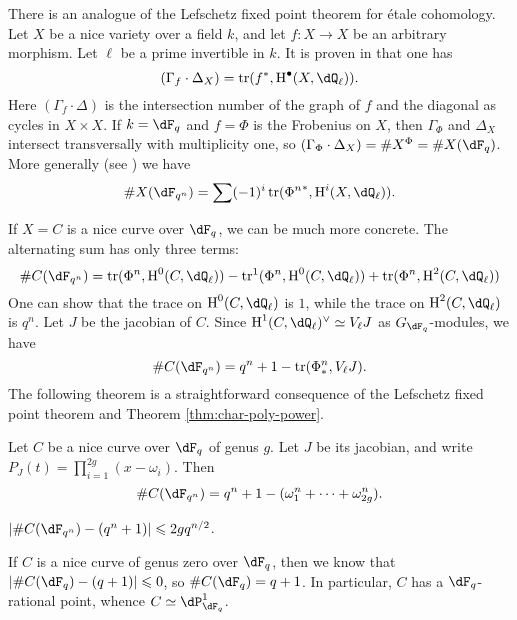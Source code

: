 \documentclass{article}
\begin{document}
There is an analogue of the Lefschetz fixed point theorem for \'etale 
cohomology. Let $X$ be a nice variety over a field $k$, and let 
$f:X\to X$ be an arbitrary morphism. Let $\ell$ be a prime invertible in $k$. 
It is proven in \cite[IV.3.3]{de77} that one has 
\[
  (\Gamma_f \cdot \Delta_X) = \trace(f^\ast,\h^\bullet(X,\dQ_\ell))\text{.}
\]
Here $(\Gamma_f\cdot \Delta)$ is the intersection number of the graph of $f$ 
and the diagonal as cycles in $X\times X$. If $k=\dF_q$ and $f=\Phi$ is the 
Frobenius on $X$, then $\Gamma_\Phi$ and $\Delta_X$ intersect transversally 
with multiplicity one, so 
$(\Gamma_\Phi\cdot \Delta_X)=\# X^\Phi=\# X(\dF_q)$. More generally (see 
\cite[IV.3.7]{de77}) we have
\[
  \# X(\dF_{q^n}) = \sum (-1)^i \trace({\Phi^n}^\ast, \h^i(X,\dQ_\ell)) \text{.}
\]

If $X=C$ is a nice curve over $\dF_q$, we can be much more concrete. The 
alternating sum has only three terms:
\[
  \# C(\dF_{q^n}) = \trace(\Phi^n,\h^0(C,\dQ_\ell)) - \trace^1(\Phi^n,\h^0(C,\dQ_\ell)) + \trace(\Phi^n,\h^2(C,\dQ_\ell))
\]
One can show that the trace on $\h^0(C,\dQ_\ell)$ is $1$, while the trace on 
$\h^2(C,\dQ_\ell)$ is $q^n$. Let $J$ be the jacobian of $C$. Since 
$\h^1(C,\dQ_\ell)^\vee \simeq V_\ell J$ as $G_{\dF_q}$-modules, we have 
\[
  \# C(\dF_{q^n}) = q^n+1 - \trace(\Phi_\ast^n, V_\ell J) \text{.}
\]
The following theorem is a straightforward consequence of the Lefschetz fixed 
point theorem and Theorem \ref{thm:char-poly-power}. 

\begin{theorem}
Let $C$ be a nice curve over $\dF_q$ of genus $g$. Let $J$ be its jacobian, and 
write $P_J(t) = \prod_{i=1}^{2 g} (x-\omega_i)$. Then 
\[
  \# C(\dF_{q^n}) = q^n+1 - (\omega_1^n + \cdots + \omega_{2 g}^n) \text{.}
\]
\end{theorem}

\begin{corollary}
$|\# C(\dF_{q^n}) - (q^n+1)| \leqslant 2 g q^{n/2}$.
\end{corollary}






\begin{example}
If $C$ is a nice curve of genus zero over $\dF_q$, then we know that 
$|\# C(\dF_q) - (q+1)| \leqslant 0$, so $\# C(\dF_q) = q+1$. In particular, 
$C$ has a $\dF_q$-rational point, whence $C\simeq \dP_{\dF_q}^1$. 
\end{example}
\end{document}
